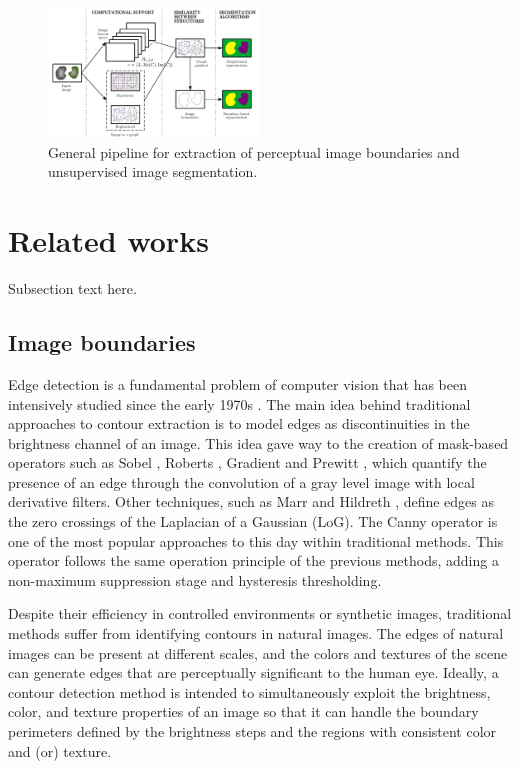 \documentclass[journal]{IEEEtran}
\begin{document}
\begin{figure}[!ht]
	\centering
	\includegraphics[width=0.5\textwidth]{img_boundaries_segmentation_diagram}
	\caption{General pipeline for extraction of perceptual image boundaries and unsupervised image segmentation.}\label{fig:pipeline_gabor_image_segmentation}
\end{figure}

\section{Related works}

Subsection text here.


\subsection{Image boundaries}
Edge detection is a fundamental problem of computer vision that has been intensively studied since the early 1970s \cite{Hueckel:JACM:1971, Fram.Deutsch:TC:1975}. The main idea behind traditional approaches to contour extraction is to model edges as discontinuities in the brightness channel of an image. This idea gave way to the creation of mask-based operators such as Sobel \cite{Sobel.Feldman:SAIL:1990}, Roberts \cite{Roberts:Thesis:1963}, Gradient \cite{Maitre:Book:2003} and Prewitt \cite{Prewitt:PPP:1970}, which quantify the presence of an edge through the convolution of a gray level image with local derivative filters. Other techniques, such as Marr and Hildreth \cite{Marr.Hildreth:PRS:1980}, define edges as the zero crossings of the Laplacian of a Gaussian (LoG). The Canny operator \cite{Canny:PAMI:1986} is one of the most popular approaches to this day within traditional methods. This operator follows the same operation principle of the previous methods, adding a non-maximum suppression stage and hysteresis thresholding. 

Despite their efficiency in controlled environments or synthetic images, traditional methods suffer from identifying contours in natural images. The edges of natural images can be present at different scales, and the colors and textures of the scene can generate edges that are perceptually significant to the human eye. Ideally, a contour detection method is intended to simultaneously exploit the brightness, color, and texture properties of an image so that it can handle the boundary perimeters defined by the brightness steps and the regions with consistent color and (or) texture.
\end{document}
